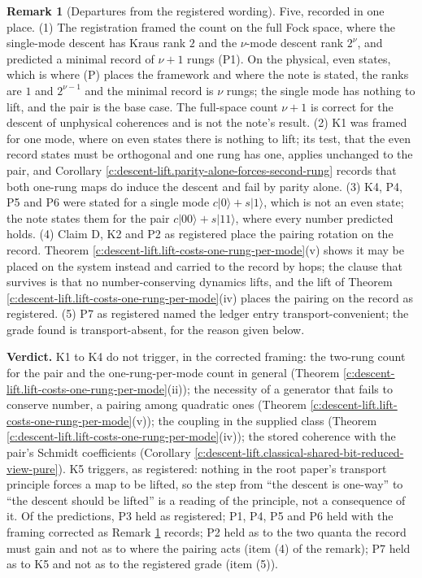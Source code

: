\documentclass[11pt]{article}
\theoremstyle{definition}
\newtheorem{remark}[theorem]{Remark}
\theoremstyle{plain}
\providecommand{\ket}{}\renewcommand{\ket}[1]{|#1\rangle}
\begin{document}
\begin{remark}[Departures from the registered wording]\label{c:note.descent-lift.departures-registered-wording}
Five, recorded in one place. (1) The registration framed the count on the full Fock space, where the single-mode descent has Kraus rank $2$ and the $\nu$-mode descent rank $2^{\nu}$, and predicted a minimal record of $\nu + 1$ rungs (P1). On the physical, even states, which is where (P) places the framework and where the note is stated, the ranks are $1$ and $2^{\nu-1}$ and the minimal record is $\nu$ rungs; the single mode has nothing to lift, and the pair is the base case. The full-space count $\nu + 1$ is correct for the descent of unphysical coherences and is not the note's result. (2) K1 was framed for one mode, where on even states there is nothing to lift; its test, that the even record states must be orthogonal and one rung has one, applies unchanged to the pair, and Corollary \ref{c:descent-lift.parity-alone-forces-second-rung} records that both one-rung maps do induce the descent and fail by parity alone. (3) K4, P4, P5 and P6 were stated for a single mode $c\ket{0} + s\ket{1}$, which is not an even state; the note states them for the pair $c\ket{00} + s\ket{11}$, where every number predicted holds. (4) Claim D, K2 and P2 as registered place the pairing rotation on the record. Theorem \ref{c:descent-lift.lift-costs-one-rung-per-mode}(v) shows it may be placed on the system instead and carried to the record by hops; the clause that survives is that no number-conserving dynamics lifts, and the lift of Theorem \ref{c:descent-lift.lift-costs-one-rung-per-mode}(iv) places the pairing on the record as registered. (5) P7 as registered named the ledger entry transport-convenient; the grade found is transport-absent, for the reason given below.
\end{remark}

\label{c:note.descent-lift.setting-what-does-two-papers-what-4}
\textbf{Verdict.} K1 to K4 do not trigger, in the corrected framing: the two-rung count for the pair and the one-rung-per-mode count in general (Theorem \ref{c:descent-lift.lift-costs-one-rung-per-mode}(ii)); the necessity of a generator that fails to conserve number, a pairing among quadratic ones (Theorem \ref{c:descent-lift.lift-costs-one-rung-per-mode}(v)); the coupling in the supplied class (Theorem \ref{c:descent-lift.lift-costs-one-rung-per-mode}(iv)); the stored coherence with the pair's Schmidt coefficients (Corollary \ref{c:descent-lift.classical-shared-bit-reduced-view-pure}). K5 triggers, as registered: nothing in the root paper's transport principle forces a map to be lifted, so the step from ``the descent is one-way'' to ``the descent should be lifted'' is a reading of the principle, not a consequence of it. Of the predictions, P3 held as registered; P1, P4, P5 and P6 held with the framing corrected as Remark \ref{c:note.descent-lift.departures-registered-wording} records; P2 held as to the two quanta the record must gain and not as to where the pairing acts (item (4) of the remark); P7 held as to K5 and not as to the registered grade (item (5)).
\end{document}
